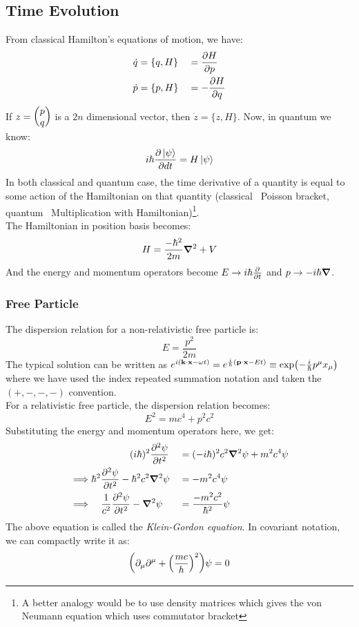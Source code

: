 \subsection{Time Evolution}
From classical Hamilton's equations of motion, we have:
\begin{alignat*}{3}
    \dot{q} &= \{q,H\} &&= \pdv{H}{p}  \\
    \dot{p} &= \{p,H\} &&= -\pdv{H}{q}
\end{alignat*}
If $z = \mqty(p\\q)$ is a $2n$ dimensional vector, then $\dot{z} = \{z,H\}$. Now, in quantum we know:
$$i\hbar \pdv{\ket{\psi}}{dt} = H\ket{\psi}$$
In both classical and quantum case, the time derivative of a quantity is equal to some action of the Hamiltonian on that quantity (classical \rightarrow \ Poisson bracket, quantum \rightarrow \ Multiplication with Hamiltonian)\footnote{A better analogy would be to use density matrices which gives the von Neumann equation which uses commutator bracket}. \\[0.2cm]
The Hamiltonian in position basis becomes: $$H = \frac{-\hbar^2}{2m}\grad^2 + V$$
And the energy and momentum operators become $E\rightarrow i\hbar \pdv{t}$ and $p\rightarrow -i\hbar \grad$.
\subsubsection{Free Particle}
The dispersion relation for a non-relativistic free particle is:
$$E = \frac{p^2}{2m}$$
The typical solution can be written as $e^{i(\vb{k}\cdot\vb{x}-\omega t)} = e^{\frac{i}{\hbar}(\vb{p}\cdot\vb{x} - Et)} \equiv \exp(-\frac{i}{\hbar}p^\mu x_\mu)$ where we have used the index repeated summation notation and taken the $(+,-,-,-)$ convention.\\[0.2cm]
For a relativistic free particle, the dispersion relation becomes:
$$E^2 = mc^4 + p^2c^2$$
Substituting the energy and momentum operators here, we get:
\begin{alignat*}{3}
    &\qquad\qquad(i\hbar)^2 \pdv[2]{\psi}{t} &&= (-i\hbar)^2c^2 \grad^2\psi + m^2c^4\psi\\
  \implies  & \hbar^2 \pdv[2]{\psi}{t} - \hbar^2c^2\grad^2\psi &&= -m^2c^4\psi\\
  \implies & \quad \frac{1}{c^2} \pdv[2]{\psi}{t} -\grad^2\psi &&= \frac{-m^2c^2}{\hbar^2}\psi
\end{alignat*}
The above equation is called the \textit{Klein-Gordon equation}. In covariant notation, we can compactly write it as:
$$\qty(\partial_\mu \partial^\mu +\qty(\frac{mc}{h})^2)\psi = 0$$
